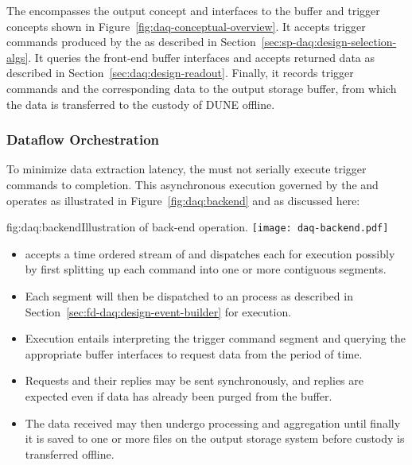The  encompasses the output concept and interfaces to the buffer and trigger concepts shown in Figure~\ref{fig:daq-conceptual-overview}. 
It accepts trigger commands produced by the  as described in Section~\ref{sec:sp-daq:design-selection-algs}. 
It queries the front-end buffer interfaces and accepts returned data as described in Section~\ref{sec:daq:design-readout}. 
Finally, it records trigger commands and the corresponding data to the output storage buffer, from which the data is transferred to the custody of DUNE offline.

\subsubsection{Dataflow Orchestration}

To minimize data extraction latency, the  must not serially execute trigger commands to completion. 
This asynchronous execution governed by the  and operates as illustrated in Figure~\ref{fig:daq:backend} and as discussed here:

\begin{dunefigure}{fig:daq:backend}{Illustration of   back-end operation.}
  \texttt{[image: daq-backend.pdf]}
\end{dunefigure}

\begin{itemize}
\item {} accepts a time ordered stream of  and dispatches each for execution possibly by first splitting up each command into one or more contiguous segments.
\item Each segment will then be dispatched to an  process as described in Section~\ref{sec:fd-daq:design-event-builder} for execution.
\item Execution entails interpreting the trigger command segment and querying the appropriate  buffer interfaces to request data from the period of time. 
\item Requests and their replies may be sent synchronously, and replies are expected even if data has already been purged from the  buffer.
\item The data received may then undergo processing and aggregation until finally it is saved to one or more files on the output storage system before custody is transferred offline.
\end{itemize}



